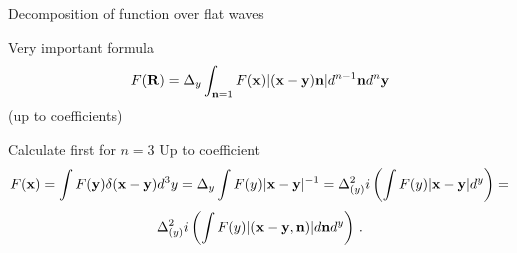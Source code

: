 

\baselineskip=14pt


\def\vare {\varepsilon}
\def\A {{\bf A}}
\def\B {{\bf B}}
\def\t {\tilde}
\def\a {\alpha}
\def\K {{\bf K}}
\def\k {{\bf k}}
\def\x {{\bf x}}
\def\y {{\bf y}}
\def\V {{\cal V}}
\def\L {{\cal L}}
\def\s {{\sigma}}
\def\S {{\Sigma}}
\def\s {{\sigma}}
\def\p{\partial}
\def\vare{{\varepsilon}}
\def\Q {{\bf Q}}
\def\O {{\bf O}}
\def\D {{\cal D}}
\def\G {{\Gamma}}
\def\C {{\bf C}}
\def\N {{\cal N}}
\def\Z {{\bf Z}}
\def\E {{\bf E}}
\def\U  {{\cal U}}
\def\H {{\cal H}}
\def\R  {{\bf R}}
\def\S  {{\bf S}}
\def\E  {{\bf E}}
\def\l {\lambda}
\def\degree {{\bf {\rm degree}\,\,}}
\def \finish {${\,\,\vrule height1mm depth2mm width 8pt}$}
\def \m {\medskip}
\def\p {\partial}
\def\r {{\bf r}}
\def\v {{\bf v}}
\def\n {{\bf n}}
\def\t {{\bf t}}
\def\b {{\bf b}}
\def\c {{\bf c }}
\def\e{{\bf e}}
\def\ac {{\bf a}}
\def \R   {{\bf R}}
\def \X   {{\bf X}}
\def \Y   {{\bf Y}}
\def \x   {{\bf x}}
\def \y   {{\bf y}}
\def \G{{\cal G}}
\def\w{\omega}
\def\finish {${\,\,\vrule height1mm depth2mm width 8pt}$}


  \centerline {Decomposition of function over flat waves}


   Very important formula
          $$
F(\R)=\Delta_{y}\int_{\n=1} F(\x)|(\x-\y)\n|d^{n-1}\n d^n\y
          $$
(up to coefficients)

  Calculate first for $n=3$
Up to coefficient
   $$
F(\x)=\int F(\y)\delta(\x-\y)d^3y=\Delta_y\int F(y) |\x-\y|^{-1}=
\Delta^2_{(y)}i\left(\int F(y)|\x-\y|d^y\right)=
         $$
         $$
\Delta^2_{(y)}i\left(\int F(y)|(\x-\y,\n)|d\n d^y\right)\,.
    $$

\bye
